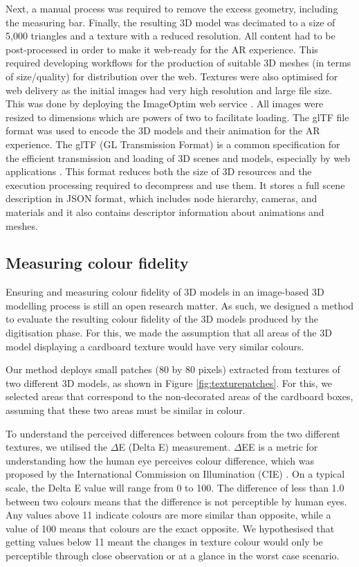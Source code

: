 \documentclass[acmlarge,screen,dvipsnames]{acmart}
\begin{document}
Next, a manual process was required to remove the excess geometry,
including the measuring bar. Finally, the resulting 3D model was
decimated to a size of 5,000 triangles and a texture with a reduced
resolution. All content had to be post-processed in order to make it
web-ready for the AR experience. This required developing workflows for
the production of suitable 3D meshes (in terms of size/quality) for
distribution over the web.  %
Textures were also optimised for web delivery as the initial images had %
very high resolution and large file size. This was done by deploying %
the ImageOptim web service \cite{ImageOptim}.   %
All images were resized to dimensions which are powers of two
to facilitate loading. 
The glTF file format was used to encode the 3D models and their animation for the AR
experience. The glTF (GL Transmission Format) is a common specification for
the efficient transmission and loading of 3D scenes and models,
especially by web applications \cite{khronos}. This format reduces both the size
of 3D resources and the execution processing required to decompress and
use them. It stores a full scene description in JSON format, which
includes node hierarchy, cameras, and materials and it also contains
descriptor information about animations and meshes.


\subsection{Measuring colour fidelity} Ensuring and measuring colour
fidelity of 3D models in an image-based 3D modelling process is still an
open research matter. As such, we designed a method to evaluate the
resulting colour fidelity of the 3D models produced by the
digitisation phase. For this, we made the assumption that all areas of
the 3D model displaying a cardboard texture would have very similar
colours.

Our method deploys small patches (80 by 80 pixels) extracted from
textures of two different 3D models, as shown in Figure
\ref{fig:texturepatches}. For this, we selected areas that correspond to the
non-decorated areas of the cardboard boxes, assuming that these two areas
must be similar in colour. 


To understand the perceived differences between colours from the two different textures, we utilised the $\Delta$E (Delta E) measurement. $\Delta$EE is a metric for understanding how the human eye perceives
colour difference, which was proposed by the International Commission on
Illumination (CIE) \cite{cie2020}. On a typical scale, the Delta E value will range
from 0 to 100. The difference of less than 1.0 between two colours means
that the difference is not perceptible by human eyes. Any values above
11 indicate colours are more similar than opposite, while a value of 100
means that colours are the exact opposite. We hypothesised that getting
values below 11 meant the changes in texture colour would only be
perceptible through close observation or at a glance in the worst
case scenario.
\end{document}
